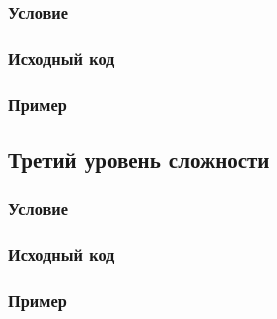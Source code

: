 \subsubsection{Условие}



\subsubsection{Исходный код}


\subsubsection{Пример}


\subsection{Третий уровень сложности}

\subsubsection{Условие}



\subsubsection{Исходный код}


\subsubsection{Пример}



